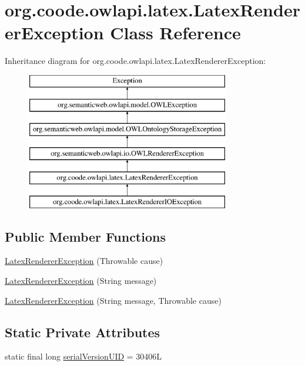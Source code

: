 \hypertarget{classorg_1_1coode_1_1owlapi_1_1latex_1_1_latex_renderer_exception}{\section{org.\-coode.\-owlapi.\-latex.\-Latex\-Renderer\-Exception Class Reference}
\label{classorg_1_1coode_1_1owlapi_1_1latex_1_1_latex_renderer_exception}
}
Inheritance diagram for org.\-coode.\-owlapi.\-latex.\-Latex\-Renderer\-Exception\-:\begin{figure}[H]
\begin{center}
\leavevmode
\includegraphics[height=6.000000cm]{classorg_1_1coode_1_1owlapi_1_1latex_1_1_latex_renderer_exception}
\end{center}
\end{figure}
\subsection*{Public Member Functions}
\begin{DoxyCompactItemize}
\item 
\hyperlink{classorg_1_1coode_1_1owlapi_1_1latex_1_1_latex_renderer_exception_a8309b7bc68d8ab6c677cd5a17fedc3fc}{Latex\-Renderer\-Exception} (Throwable cause)
\item 
\hyperlink{classorg_1_1coode_1_1owlapi_1_1latex_1_1_latex_renderer_exception_a016fad99b384d221f3b175d4408e4f55}{Latex\-Renderer\-Exception} (String message)
\item 
\hyperlink{classorg_1_1coode_1_1owlapi_1_1latex_1_1_latex_renderer_exception_aa456a54e0c53f5cf941f36dbb56e63d8}{Latex\-Renderer\-Exception} (String message, Throwable cause)
\end{DoxyCompactItemize}
\subsection*{Static Private Attributes}
\begin{DoxyCompactItemize}
\item 
static final long \hyperlink{classorg_1_1coode_1_1owlapi_1_1latex_1_1_latex_renderer_exception_a05031643d9cf2d836b64c8a55f3befec}{serial\-Version\-U\-I\-D} = 30406\-L
\end{DoxyCompactItemize}
